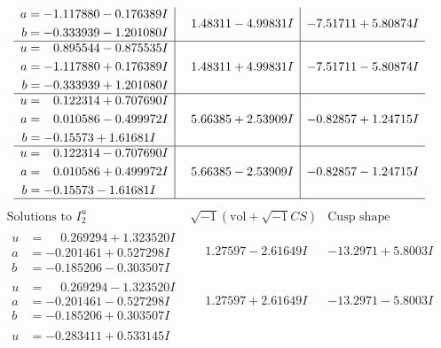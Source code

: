 \documentclass[1p]{elsarticle_modified}
\theoremstyle{definition}
\newcommand{\I}{\sqrt{-1}}
\begin{document}
$$\begin{array}{c|c|c}
\begin{aligned}
a &= -1.117880 - 0.176389 I \\
b &= -0.333939 - 1.201080 I\end{aligned}
 & \phantom{-}1.48311 - 4.99831 I & -7.51711 + 5.80874 I \\ \hline\begin{aligned}
u &= \phantom{-}0.895544 - 0.875535 I \\
a &= -1.117880 + 0.176389 I \\
b &= -0.333939 + 1.201080 I\end{aligned}
 & \phantom{-}1.48311 + 4.99831 I & -7.51711 - 5.80874 I \\ \hline\begin{aligned}
u &= \phantom{-}0.122314 + 0.707690 I \\
a &= \phantom{-}0.010586 - 0.499972 I \\
b &= -0.15573 + 1.61681 I\end{aligned}
 & \phantom{-}5.66385 + 2.53909 I & -0.82857 + 1.24715 I \\ \hline\begin{aligned}
u &= \phantom{-}0.122314 - 0.707690 I \\
a &= \phantom{-}0.010586 + 0.499972 I \\
b &= -0.15573 - 1.61681 I\end{aligned}
 & \phantom{-}5.66385 - 2.53909 I & -0.82857 - 1.24715 I\\
 \hline 
 \end{array}$$\newpage$$\begin{array}{c|c|c}  
\text{Solutions to }I^u_{2}& \I (\text{vol} + \sqrt{-1}CS) & \text{Cusp shape}\\
 \hline 
\begin{aligned}
u &= \phantom{-}0.269294 + 1.323520 I \\
a &= -0.201461 + 0.527298 I \\
b &= -0.185206 - 0.303507 I\end{aligned}
 & \phantom{-}1.27597 - 2.61649 I & -13.2971 + 5.8003 I \\ \hline\begin{aligned}
u &= \phantom{-}0.269294 - 1.323520 I \\
a &= -0.201461 - 0.527298 I \\
b &= -0.185206 + 0.303507 I\end{aligned}
 & \phantom{-}1.27597 + 2.61649 I & -13.2971 - 5.8003 I \\ \hline\begin{aligned}
u &= -0.283411 + 0.533145 I \\

\end{aligned}
\end{array}$$
\end{document}
